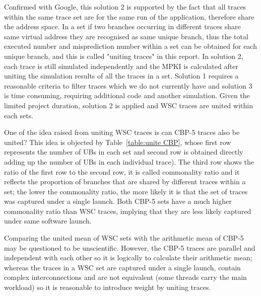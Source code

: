 \hspace*{\fill}\par
Confirmed with Google, this solution 2 is supported by the fact that all traces within the same trace set are for the same run of the application, therefore share the address space. In a set if two branches occurring in different traces share same virtual address they are recognised as same unique branch, thus the total executed number and misprediction number within a set can be obtained for each unique branch, and this is called "uniting traces" in this report. In solution 2, each trace is still simulated independently and the MPKI is calculated after uniting the simulation results of all the traces in a set. Solution 1 requires a reasonable criteria to filter traces which we do not currently have and solution 3 is time consuming, requiring additional code and another simulation. Given the limited project duration, solution 2 is applied and WSC traces are united within each sets.\par\hspace*{\fill}\par

One of the idea raised from uniting WSC traces is can CBP-5 traces also be united? This idea is objected by Table~\ref{table:unite CBP}, whose first row represents the number of UBs in each set and second row is obtained directly adding up the number of UBs in each individual trace). The third row shows the ratio of the first row to the second row, it is called commonality ratio and it reflects the proportion of branches that are shared by different traces within a set; the lower the commonality ratio, the more likely it is that the set of traces was captured under a single launch. Both CBP-5 sets have a much higher commonality ratio than WSC traces, implying that they are less likely captured under same software launch.\par\hspace*{\fill}\par

Comparing the united mean of WSC sets with the arithmetic mean of CBP-5 may be questioned to be unscientific. However, the CBP-5 traces are parallel and independent with each other so it is logically to calculate their arithmetic mean; whereas the traces in a WSC set are captured under a single launch, contain complex interconnections and are not equivalent (some threads carry the main workload) so it is reasonable to introduce weight by uniting traces.


